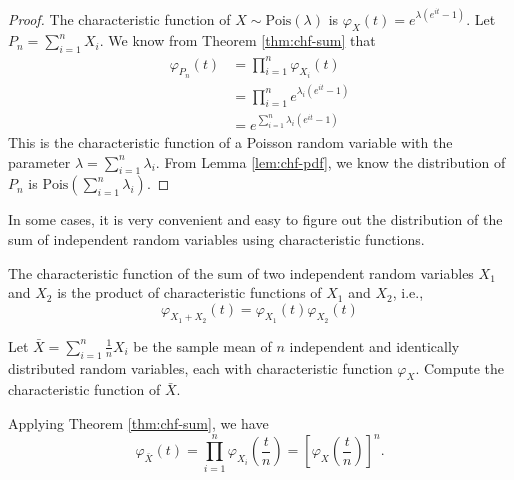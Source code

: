 \documentclass[
  lang=cn,
  11pt,
  scheme=chinese,
  chinesefont=nofont,
  citestyle=gb7714-2015,
  bibstyle=gb7714-2015]{elegantbook}
\begin{document}
\begin{proof}
{}The characteristic function of \(X\sim\mathrm{Pois}(\lambda)\) is \(\varphi _{X}(t)=e^{\lambda (e^{it}-1)}\). Let \(P_n=\sum_{i=1}^nX_i\). We know from Theorem \ref{thm:chf-sum} that \begin{equation*}
\begin{split}
\varphi _{P_{n}}(t) & =\prod_{i=1}^n\varphi _{X_i}(t) \\
& =\prod_{i=1}^n e^{\lambda_i (e^{it}-1)} \\
& = e^{\sum_{i=1}^n \lambda_i (e^{it}-1)}
\end{split}
\end{equation*} This is the characteristic function of a Poisson random variable with the parameter \(\lambda=\sum_{i=1}^n \lambda_i\). From Lemma \ref{lem:chf-pdf}, we know the distribution of \(P_n\) is \(\mathrm{Pois}(\sum_{i=1}^n\lambda_i)\). \end{proof}

\begin{remark}
{}In some cases, it is very convenient and easy to figure out the distribution of the sum of independent random variables using characteristic functions. \end{remark}

\begin{corollary}{}{}
\protect\hypertarget{cor:unnamed-chunk-8}{}{\label{cor:unnamed-chunk-8} }The characteristic function of the sum of two independent random variables \(X_1\) and \(X_2\) is the product of characteristic functions of \(X_1\) and \(X_2\), i.e., \[\varphi _{X_1+X_2}(t)=\varphi _{X_1}(t) \varphi _{X_2}(t)\] \end{corollary}

\begin{exercise}
\protect\hypertarget{exr:unnamed-chunk-9}{}{\label{exr:unnamed-chunk-9} {} }Let \(\bar{X}=\sum_{i=1}^n \frac{1}{n} X_i\) be the sample mean of \(n\) independent and identically distributed random variables, each with characteristic function \(\varphi _{X}\). Compute the characteristic function of \(\bar{X}\). \end{exercise}

\begin{solution}
{}Applying Theorem \ref{thm:chf-sum}, we have \[\varphi _{\bar{X}}(t)=\prod_{i=1}^n \varphi _{X_i}\left(\frac{t}{n}\right)=\left[\varphi _{X}\left(\frac{t}{n}\right)\right]^n.\] \end{solution}
\end{document}
